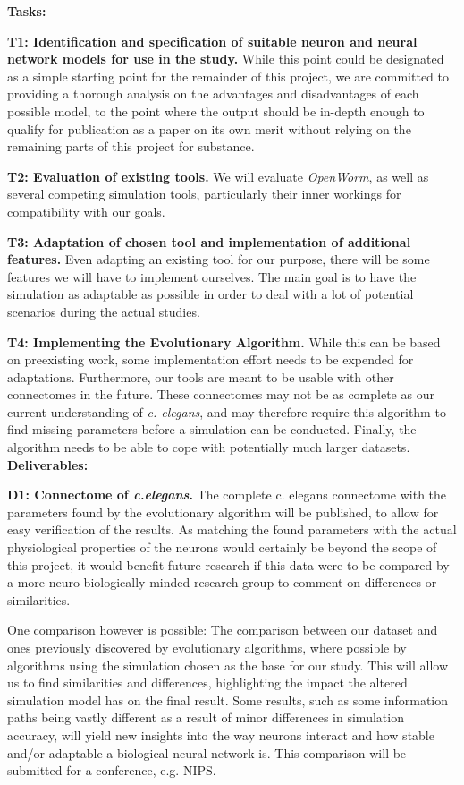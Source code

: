\documentclass[a4paper,11pt]{article}
\begin{document}
\textbf{Tasks:}

\textbf{T1: Identification and specification of suitable neuron and neural network models for use in the study.}
While this point could be designated as a simple starting point for the remainder of this project, we are committed to providing a thorough analysis on the advantages and disadvantages of each possible model, to the point where the output should be in-depth enough to qualify for publication as a paper on its own merit without relying on the remaining parts of this project for substance.

\textbf{T2: Evaluation of existing tools.}
We will evaluate \emph{OpenWorm}, as well as several competing simulation tools, particularly their inner workings for compatibility with our goals.

\textbf{T3: Adaptation of chosen tool and implementation of additional features.}
Even adapting an existing tool for our purpose, there will be some features we will have to implement ourselves. The main goal is to have the simulation as adaptable as possible in order to deal with a lot of potential scenarios during the actual studies.

\textbf{T4: Implementing the Evolutionary Algorithm.} While this can be based on preexisting work, some implementation effort needs to be expended for adaptations. Furthermore, our tools are meant to be usable with other connectomes in the future. These connectomes may not be as complete as our current understanding of \emph{c. elegans}, and may therefore require this algorithm to find missing parameters before a simulation can be conducted. Finally, the algorithm needs to be able to cope with potentially much larger datasets.
\\[0,2cm]



\textbf{Deliverables:}

\textbf{D1: Connectome of \emph{c.elegans}.}
The complete c. elegans connectome with the parameters found by the evolutionary algorithm will be published, to allow for easy verification of the results. As matching the found parameters with the actual physiological properties of the neurons would certainly be beyond the scope of this project, it would benefit future research if this data were to be compared by a more neuro-biologically minded research group to comment on differences or similarities.

One comparison however is possible: The comparison between our dataset and ones previously discovered by evolutionary algorithms, where possible by algorithms using the simulation chosen as the base for our study. This will allow us to find similarities and differences, highlighting the impact the altered simulation model has on the final result. Some results, such as some information paths being vastly different as a result of minor differences in simulation accuracy, will yield new insights into the way neurons interact and how stable and/or adaptable a biological neural network is. This comparison will be submitted for a conference, e.g. NIPS. 
\end{document}
